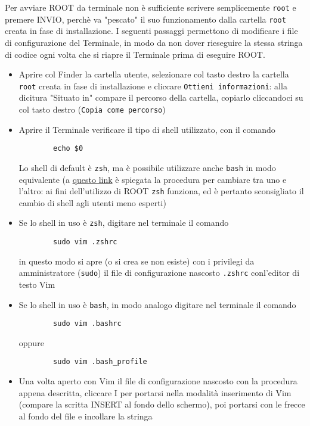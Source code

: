 Per avviare ROOT da terminale non è sufficiente scrivere semplicemente \texttt{root} e premere INVIO, perchè va "pescato" il suo funzionamento dalla cartella \texttt{root} creata in fase di installazione. I seguenti passaggi permettono di modificare i file di configurazione del Terminale, in modo da non dover rieseguire la stessa stringa di codice ogni volta che si riapre il Terminale prima di eseguire ROOT.
\begin{itemize}
	\item Aprire col Finder la cartella utente, selezionare col tasto destro la cartella \texttt{root} creata in fase di installazione e cliccare \texttt{Ottieni informazioni}: alla dicitura "Situato in" compare il percorso della cartella, copiarlo cliccandoci su col tasto destro (\texttt{Copia come percorso})
	\item Aprire il Terminale verificare il tipo di shell utilizzato, con il comando
	\begin{verbatim}
		echo $0
	\end{verbatim}
	Lo shell di default è \texttt{zsh}, ma è possibile utilizzare anche \texttt{bash} in modo equivalente (a \hyperref{https://www.howtogeek.com/444596/how-to-change-the-default-shell-to-bash-in-macos-catalina/}{}{}{questo link} è spiegata la procedura per cambiare tra uno e l'altro: ai fini dell'utilizzo di ROOT \texttt{zsh} funziona, ed è pertanto sconsigliato il cambio di shell agli utenti meno esperti)
	\item Se lo shell in uso è \texttt{zsh}, digitare nel terminale il comando
	\begin{verbatim}
		sudo vim .zshrc
	\end{verbatim}
	in questo modo si apre (o si crea se non esiste) con i privilegi da amministratore (\texttt{sudo}) il file di configurazione nascosto \texttt{.zshrc} conl'editor di testo Vim
	\item Se lo shell in uso è \texttt{bash}, in modo analogo digitare nel terminale il comando
	\begin{verbatim}
		sudo vim .bashrc
	\end{verbatim}
	oppure
	\begin{verbatim}
		sudo vim .bash_profile
	\end{verbatim}
	\item Una volta aperto con Vim il file di configurazione nascosto con la procedura appena descritta, cliccare I per portarsi nella modalità inserimento di Vim (compare la scritta INSERT al fondo dello schermo), poi portarsi con le frecce al fondo del file e incollare la stringa

\end{itemize}
